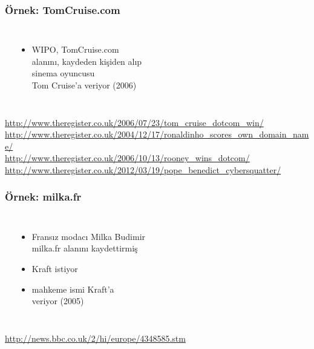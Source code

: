 \documentclass[dvipsnames]{beamer}
\theoremstyle{plain}
\begin{document}
\begin{frame}
  \frametitle{Örnek: TomCruise.com}

  \begin{columns}
    \begin{center}
    \end{center}

    \begin{itemize}
      \item WIPO, TomCruise.com\\
        alanını, kaydeden kişiden alıp\\
        sinema oyuncusu\\
        Tom Cruise'a veriyor (2006)
    \end{itemize}
  \end{columns}

  \medskip
  \tiny{\url{http://www.theregister.co.uk/2006/07/23/tom_cruise_dotcom_win/}}\\
  \tiny{\url{http://www.theregister.co.uk/2004/12/17/ronaldinho_scores_own_domain_name/}}\\
  \tiny{\url{http://www.theregister.co.uk/2006/10/13/rooney_wins_dotcom/}}\\
  \tiny{\url{http://www.theregister.co.uk/2012/03/19/pope_benedict_cybersquatter/}}\\
\end{frame}

\begin{frame}
  \frametitle{Örnek: milka.fr}

  \begin{columns}
    \begin{center}
    \end{center}

    \begin{itemize}
      \item Fransız modacı Milka Budimir\\
        milka.fr alanını kaydettirmiş
      \item Kraft istiyor
      \item mahkeme ismi Kraft'a\\
        veriyor (2005)
    \end{itemize}
  \end{columns}

  \medskip
  \tiny{\url{http://news.bbc.co.uk/2/hi/europe/4348585.stm}}\\
\end{frame}
\end{document}
